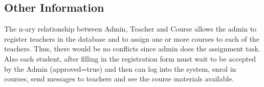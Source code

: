 \subsection{Other Information}
 
The n-ary relationship between Admin, Teacher and Course allows the admin to register teachers in the database and to assign one or more courses to each of the teachers. Thus, there would be no conflicts since admin does the assignment task. \newline
Also each student, after filling in the registration form must wait to be accepted by the Admin (approved=true) and then can log into the system, enrol in courses, send messages to teachers and see the course materials available.